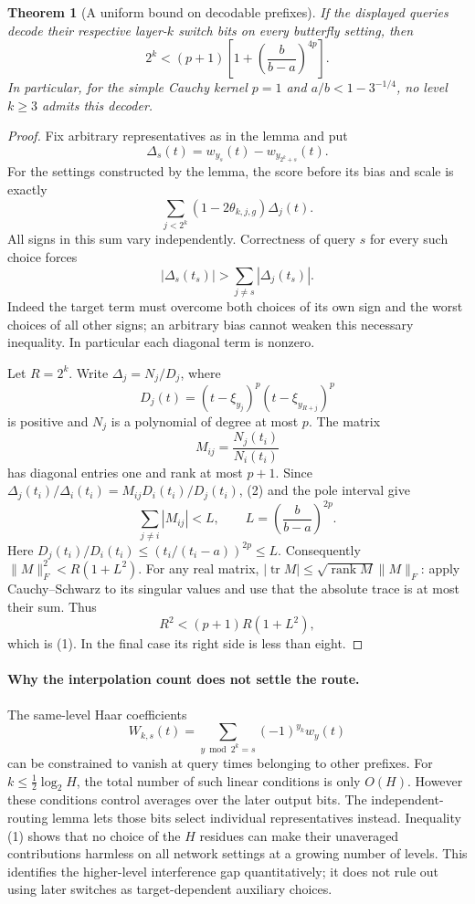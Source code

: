 \documentclass[11pt]{article}
\newtheorem{theorem}{Theorem}
\begin{document}
\begin{theorem}[A uniform bound on decodable prefixes]
If the displayed queries decode their respective layer-$k$ switch bits
on every butterfly setting, then
\[
 2^k<(p+1)\left[1+\left(\frac b{b-a}\right)^{4p}\right].
 \tag{1}
\]
In particular, for the simple Cauchy kernel $p=1$ and
$a/b<1-3^{-1/4}$, no level $k\geq3$ admits this decoder.
\end{theorem}
\begin{proof}
Fix arbitrary representatives as in the lemma and put
\[
 \Delta_s(t)=w_{y_s}(t)-w_{y_{2^k+s}}(t).
\]
For the settings constructed by the lemma, the score before its bias
and scale is exactly
\[
 \sum_{j<2^k}(1-2\theta_{k,j,g})\Delta_j(t).
\]
All signs in this sum vary independently. Correctness of query $s$
for every such choice forces
\[
 |\Delta_s(t_s)|>\sum_{j\ne s}|\Delta_j(t_s)|.
 \tag{2}
\]
Indeed the target term must overcome both choices of its own sign and
the worst choices of all other signs; an arbitrary bias cannot weaken
this necessary inequality. In particular each diagonal term is nonzero.

Let $R=2^k$. Write $\Delta_j=N_j/D_j$, where
\[
 D_j(t)=(t-\xi_{y_j})^p(t-\xi_{y_{R+j}})^p
\]
is positive and $N_j$ is a polynomial of degree at most $p$.
The matrix
\[
 M_{ij}=\frac{N_j(t_i)}{N_i(t_i)}
\]
has diagonal entries one and rank at most $p+1$. Since
$\Delta_j(t_i)/\Delta_i(t_i)=M_{ij}D_i(t_i)/D_j(t_i)$,
(2) and the pole interval give
\[
 \sum_{j\ne i}|M_{ij}|<L,\qquad
 L=\left(\frac b{b-a}\right)^{2p}.
\]
Here $D_j(t_i)/D_i(t_i)\leq(t_i/(t_i-a))^{2p}\leq L$.
Consequently $\|M\|_F^2<R(1+L^2)$. For any real matrix,
$|\operatorname{tr}M|\leq\sqrt{\operatorname{rank}M}\|M\|_F$:
apply Cauchy--Schwarz to its singular values and use that the absolute
trace is at most their sum. Thus
\[
 R^2<(p+1)R(1+L^2),
\]
which is (1). In the final case its right side is less than eight.
\end{proof}

\paragraph{Why the interpolation count does not settle the route.}
The same-level Haar coefficients
\[
 W_{k,s}(t)=\sum_{y\bmod 2^k=s}(-1)^{y_k}w_y(t)
\]
can be constrained to vanish at query times belonging to other prefixes.
For $k\leq\frac12\log_2H$, the total number of such linear conditions
is only $O(H)$. However these conditions control averages over the later
output bits. The independent-routing lemma lets those bits select
individual representatives instead. Inequality (1) shows that no choice
of the $H$ residues can make their unaveraged contributions harmless on
all network settings at a growing number of levels. This identifies the
higher-level interference gap quantitatively; it does not rule out using
later switches as target-dependent auxiliary choices.
\end{document}
